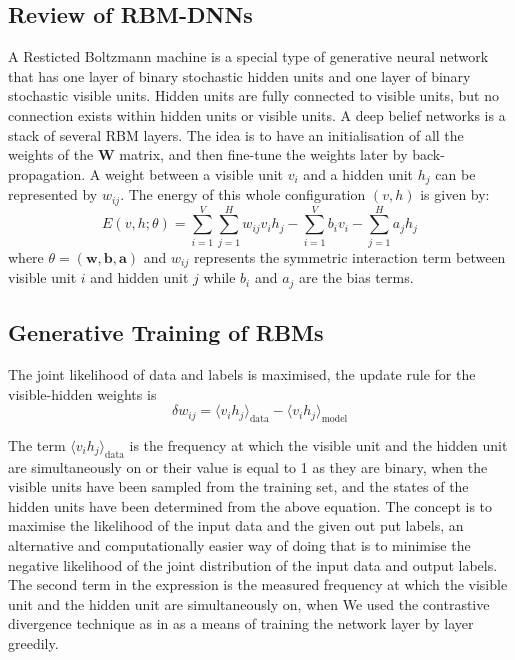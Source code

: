 \subsection{Review of RBM-DNNs}
A Resticted Boltzmann machine is a special type of generative neural network that has one layer of binary stochastic hidden units and one layer of binary stochastic visible units.
Hidden units are fully connected to visible units, but no connection exists within hidden units or visible units.
A deep belief networks is a stack of several RBM layers.
The idea is to have an initialisation of all the weights of the $\mathbf{W}$ matrix, and then fine-tune the weights later by back-propagation. A weight between a visible unit $v_i$ and a hidden unit $h_j$ can be represented by $w_{ij}$. The energy of this whole configuration $(v, h)$ is given by:
\begin{equation}
	E(v, h; \theta) = \sum_{i=1}^{V} \sum_{j=1}^{H} w_{ij} v_{i}h_{j} - \sum_{i=1}^{V}b_{i}v_{i} - \sum_{j=1}^{H}a_{j}h_{j}
\end{equation}
where $\theta = (\mathbf{w, b, a})$ and $w_{ij}$ represents the symmetric interaction term between visible unit $i$ and hidden unit $j$ while $b_i$ and $a_j$ are the bias terms.  

\subsection{Generative Training of RBMs}
The joint likelihood of data and labels is maximised, the update rule for the visible-hidden weights is 
\begin{equation}
	\delta w_{ij} = \langle v_i h_j  \rangle_{\mbox{data}} - \langle v_i h_j \rangle_{\mbox{model}}
\end{equation}


The term $\langle v_{i}h_{j} \rangle_{\mbox{data}} $ is the frequency at which the visible unit and the hidden unit are simultaneously on or their value is equal to 1 as they are binary, when the visible units have been sampled from the training set, and the states of the hidden units have been determined from the above equation. The concept is to maximise the likelihood of the input data and the given out put labels, an alternative and computationally easier way of doing that is to minimise the negative likelihood of the joint distribution of the input data and output labels. The second term in the expression is the measured frequency at which the visible unit and the hidden unit are simultaneously on, when   We used the contrastive divergence technique as in \cite{hinton06} \cite{dbn09} as a means of training the network layer by layer greedily.  

